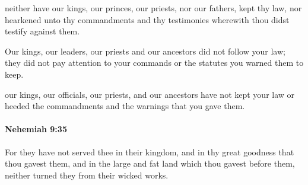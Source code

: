 			\begin{versebox}
					\item[BHS] 
					\item[LXX] 
					\item[ASV] neither have our kings, our princes, our priests, nor our fathers, kept thy law, nor hearkened unto thy commandments and thy testimonies wherewith thou didst testify against them.
					\item[NIV] Our kings, our leaders, our priests and our ancestors did not follow your law; they did not pay attention to your commands or the statutes you warned them to keep.
					\item[NRSV] our kings, our officials, our priests, and our ancestors have not kept your law or heeded the commandments and the warnings that you gave them.
			\end{versebox}

		\paragraph{Nehemiah 9:35} %
			\label{NEHEMIAH-9-35}

			For they have not served thee in their kingdom, and in thy great goodness that thou gavest them, and in the large and fat land which thou gavest before them, neither turned they from their wicked works.

